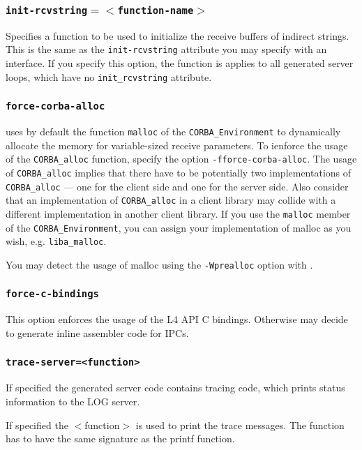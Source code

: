 \subsubsection{{\tt init-rcvstring$=<$function-name$>$}}
Specifies a function to be used to initialize the receive buffers of indirect
strings. This is the same as the \verb|init-rcvstring| attribute you may specify
with an interface. If you specify this option, the function is applies to all 
generated server loops, which have no \verb|init_rcvstring| attribute.

\subsubsection{{\tt force-corba-alloc}}
\label{sec:force-corba-alloc}

\dice{} uses by default the function \verb|malloc| of
the \verb|CORBA_Environment| to dynamically allocate 
the memory for variable-sized receive parameters. To ienforce
the usage of the \verb|CORBA_alloc|
function, specify the option {\tt -fforce-corba-alloc}. The usage of
\verb|CORBA_alloc| implies that there
have to be potentially two implementations of \verb|CORBA_alloc| --- one
for the client side and one for the server side. Also consider that
an implementation of \verb|CORBA_alloc| in a client library may collide with
a different implementation in another client library.
If you use the \verb|malloc| member of the \verb|CORBA_Environment|,
you can assign your implementation of malloc as you wish, e.g.
\verb|liba_malloc|.

You may detect the usage of malloc using the
\verb|-Wprealloc| option with \dice{}.


\subsubsection{{\tt force-c-bindings}}
This option enforces the usage of the L4 API C bindings. Otherwise \dice{}
may decide to generate inline assembler code for IPCs.

\subsubsection{{\tt trace-server=<function>}}
If specified the generated server code contains tracing code, which prints
status information to the LOG server.

If specified the $<$function$>$ is used to print the trace messages. The function
has to have the same signature as the printf function.

